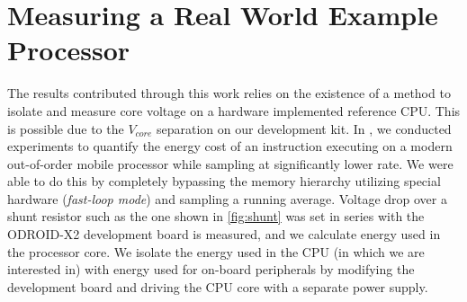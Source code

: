 \section{Measuring a Real World Example Processor}

The results contributed through this work relies on the existence of a method to
isolate and measure core voltage on a hardware implemented reference CPU. This
is possible due to the $V_{core}$ separation on our development kit. In
\cite{rundehvatum2013exploring}, we conducted experiments to quantify the energy
cost of an instruction executing on a modern out-of-order mobile processor while
sampling at significantly lower rate. We were able to do this by completely
bypassing the memory hierarchy utilizing special hardware (\emph{fast-loop
mode}) and sampling a running average. Voltage drop over a shunt resistor such
as the one shown in \autoref{fig:shunt} was set in series with the ODROID-X2
development board is measured, and we calculate energy used in the processor
core. We isolate the energy used in the CPU (in which we are interested in) with
energy used for on-board peripherals by modifying the development board and
driving the CPU core with a separate power supply.


